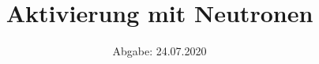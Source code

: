 

\subject{Versuch V702}
\title{Aktivierung mit Neutronen}
\date{%
  Abgabe: 24.07.2020
}



\maketitle
\thispagestyle{empty}
\tableofcontents
\newpage






\newpage
\printbibliography{}


